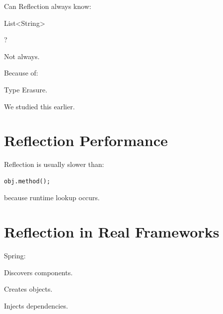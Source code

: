 \documentclass[11pt,a4paper]{book}
\begin{document}
Can Reflection always know:

List<String>

?


Not always.


Because of:


Type Erasure.


We studied this earlier.


\section{Reflection Performance}

Reflection is usually slower than:

\begin{verbatim} 
obj.method();
\end{verbatim}


because runtime lookup occurs.


\section{Reflection in Real Frameworks}

Spring:


Discovers components.


Creates objects.


Injects dependencies.
\end{document}
